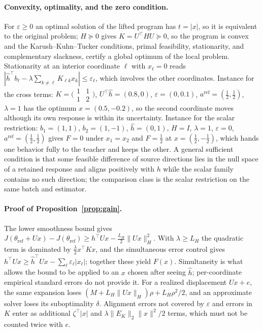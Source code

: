 \paragraph{Convexity, optimality, and the zero condition.}
For $\varepsilon\ge0$ an optimal solution of the lifted program has
$t=|x|$, so it is equivalent to the original problem; $H\succeq0$
gives $K=U^{\top}HU\succeq0$, so the program is convex and the
Karush--Kuhn--Tucker conditions, primal feasibility, stationarity, and
complementary slackness, certify a global optimum of the local
problem. Stationarity at an interior coordinate $\ell$ with $x_\ell=0$
reads $|\hat h^{\top}b_\ell-\lambda\sum_{k\ne\ell}K_{\ell k}x_k|\le\varepsilon_\ell$,
which involves the other coordinates. Instance for the cross terms:
$K=\bigl(\begin{smallmatrix}1&1\\1&2\end{smallmatrix}\bigr)$,
$U^{\top}\hat h=(0.8,0)$, $\varepsilon=(0,0.1)$, $a^{\mathrm{ref}}=(\tfrac12,\tfrac12)$,
$\lambda=1$ has the optimum $x=(0.5,-0.2)$, so the second coordinate
moves although its own response is within its uncertainty. Instance
for the scalar restriction: $b_1=(1,1)$, $b_2=(1,-1)$, $\hat h=(0,1)$,
$H=I$, $\lambda=1$, $\varepsilon=0$, $a^{\mathrm{ref}}=(\tfrac12,\tfrac12)$
gives $F=0$ under $x_1=x_2$ and $F=\tfrac12$ at $x=(\tfrac12,-\tfrac12)$,
which hands one behavior fully to the teacher and keeps the other. A
general sufficient condition is that some feasible difference of
source directions lies in the null space of a retained response and
aligns positively with $h$ while the scalar family contains no such
direction; the comparison class is the scalar restriction on the same
batch and estimator.

\paragraph{Proof of Proposition~\ref{prop:gain}.}
The lower smoothness bound gives
$J(\theta_{\mathrm{ref}}+Ux)-J(\theta_{\mathrm{ref}})\ge h^{\top}Ux-\tfrac{L_H}{2}\|Ux\|_H^2$.
With $\lambda\ge L_H$ the quadratic term is dominated by
$\tfrac{\lambda}{2}x^{\top}Kx$, and the simultaneous error control
gives $h^{\top}Ux\ge\hat h^{\top}Ux-\sum_\ell\varepsilon_\ell|x_\ell|$;
together these yield $F(x)$. Simultaneity is what allows the bound to
be applied to an $x$ chosen after seeing $\hat h$; per-coordinate
empirical standard errors do not provide it. For a realized
displacement $Ux+e$, the same expansion loses
$(M+L_H\|Ux\|_H)\rho+L_H\rho^2/2$, and an approximate solver loses its
suboptimality $\delta$. Alignment errors not covered by $\varepsilon$
and errors in $K$ enter as additional $\zeta^{\top}|x|$ and
$\lambda\|E_K\|_2\|x\|^2/2$ terms, which must not be counted twice
with $e$.

